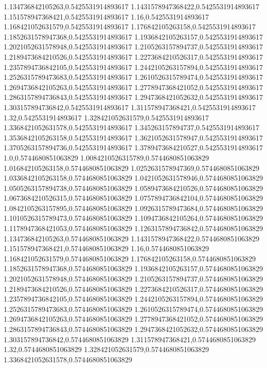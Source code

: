 1.134736842105263,0.5425531914893617
1.1431578947368422,0.5425531914893617
1.151578947368421,0.5425531914893617
1.16,0.5425531914893617
1.168421052631579,0.5425531914893617
1.176842105263158,0.5425531914893617
1.1852631578947368,0.5425531914893617
1.1936842105263157,0.5425531914893617
1.2021052631578948,0.5425531914893617
1.2105263157894737,0.5425531914893617
1.2189473684210526,0.5425531914893617
1.2273684210526317,0.5425531914893617
1.2357894736842105,0.5425531914893617
1.2442105263157894,0.5425531914893617
1.2526315789473683,0.5425531914893617
1.2610526315789474,0.5425531914893617
1.2694736842105263,0.5425531914893617
1.2778947368421052,0.5425531914893617
1.2863157894736843,0.5425531914893617
1.2947368421052632,0.5425531914893617
1.303157894736842,0.5425531914893617
1.311578947368421,0.5425531914893617
1.32,0.5425531914893617
1.328421052631579,0.5425531914893617
1.3368421052631578,0.5425531914893617
1.345263157894737,0.5425531914893617
1.3536842105263158,0.5425531914893617
1.3621052631578947,0.5425531914893617
1.3705263157894736,0.5425531914893617
1.3789473684210527,0.5425531914893617
1.0,0.5744680851063829
1.0084210526315789,0.5744680851063829
1.016842105263158,0.5744680851063829
1.0252631578947369,0.5744680851063829
1.0336842105263158,0.5744680851063829
1.0421052631578946,0.5744680851063829
1.0505263157894738,0.5744680851063829
1.0589473684210526,0.5744680851063829
1.0673684210526315,0.5744680851063829
1.0757894736842104,0.5744680851063829
1.0842105263157895,0.5744680851063829
1.0926315789473684,0.5744680851063829
1.1010526315789473,0.5744680851063829
1.1094736842105264,0.5744680851063829
1.1178947368421053,0.5744680851063829
1.1263157894736842,0.5744680851063829
1.134736842105263,0.5744680851063829
1.1431578947368422,0.5744680851063829
1.151578947368421,0.5744680851063829
1.16,0.5744680851063829
1.168421052631579,0.5744680851063829
1.176842105263158,0.5744680851063829
1.1852631578947368,0.5744680851063829
1.1936842105263157,0.5744680851063829
1.2021052631578948,0.5744680851063829
1.2105263157894737,0.5744680851063829
1.2189473684210526,0.5744680851063829
1.2273684210526317,0.5744680851063829
1.2357894736842105,0.5744680851063829
1.2442105263157894,0.5744680851063829
1.2526315789473683,0.5744680851063829
1.2610526315789474,0.5744680851063829
1.2694736842105263,0.5744680851063829
1.2778947368421052,0.5744680851063829
1.2863157894736843,0.5744680851063829
1.2947368421052632,0.5744680851063829
1.303157894736842,0.5744680851063829
1.311578947368421,0.5744680851063829
1.32,0.5744680851063829
1.328421052631579,0.5744680851063829
1.3368421052631578,0.5744680851063829

